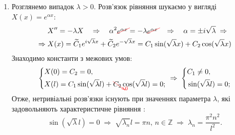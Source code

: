 \begin{enumerate}
\begin{enumerate}[wide, labelindent=0pt]
        \item Розглянемо випадок $\lambda > 0$. Розв'язок рівняння шукаємо у вигляді $X(x) = e^{\alpha x}$: 
        \begin{equation*}
            \begin{aligned}
                &X^{\prime\prime} = -\lambda X
                \quad\Rightarrow\quad
                \alpha^2 \textcolor{red}{\begin{xy}*{\textcolor{black}{e^{\alpha x}}};p+LD;+RU**h@{}+/\jot/**h@{-}\end{xy}} = -\lambda \textcolor{red}{\begin{xy}*{\textcolor{black}{e^{\alpha x}}};p+LD;+RU**h@{}+/\jot/**h@{-}\end{xy}}
                \quad\Rightarrow\quad
                \alpha = \pm i\sqrt{\lambda}
                \;\Rightarrow\\
                \Rightarrow\;
                &X(x) = \widetilde{C}_1 e^{i\sqrt{\lambda}x} + \widetilde{C}_2 e^{-\sqrt{\lambda}x} = C_1 \sin(\sqrt{\lambda}x) + C_2 \cos({\sqrt{\lambda}x})
            \end{aligned}
        \end{equation*}
        Знаходимо константи з межових умов:
        \begin{equation*}
            \begin{aligned}
                \left\{ \begin{aligned}
                    &X(0) = C_2 = 0, \\ 
                    &X(l) = C_1 \sin(\sqrt{\lambda}l) + \textcolor{red}{\begin{xy}*{\textcolor{black}{C_2}};p+LU;+RD**h@{}+//**h@{-}*h@{>}*h!LD{\scriptstyle 0}\end{xy}} \cos({\sqrt{\lambda}l}) = 0;
                \end{aligned} \right.
                \;\Rightarrow\;
                \left\{ \begin{aligned}
                    &C_1 \neq 0, \\ 
                    &\sin(\sqrt{\lambda}l) = 0;
                \end{aligned} \right.
            \end{aligned}
        \end{equation*}
        Отже, нетривіальні розв'язки існують при значеннях параметра $\lambda$, які задовольняють характеристичне рівняння :
        \begin{equation*}
            \sin(\sqrt{\lambda}l) = 0
            \;\Rightarrow\;
            \sqrt{\lambda_n}l = \pi n, \, n \in \mathbb{Z}
            \;\Rightarrow\;
            \lambda_n = \frac{\pi^2 n^2}{l^2}.
        \end{equation*}
    \end{enumerate}
\end{enumerate} 
